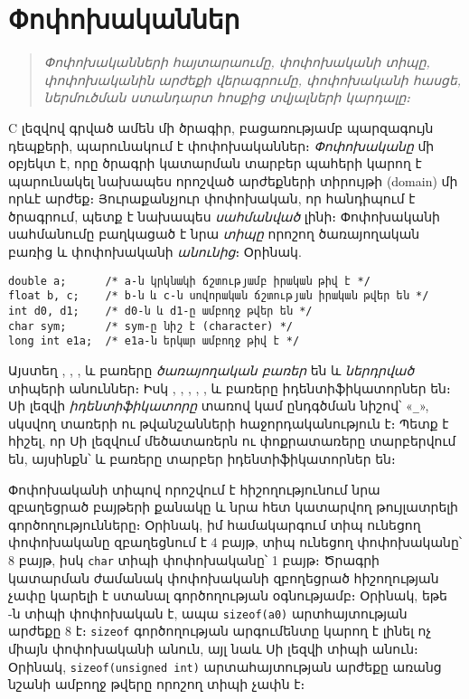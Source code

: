 \chapter{Փոփոխականներ}

\begin{quote}
\emph{Փոփոխականների հայտարաումը, փոփոխականի տիպը, փոփոխականին արժեքի
վերագրումը, փոփոխականի հասցե, ներմուծման ստանդարտ հոսքից տվյալների
կարդալը։}
\end{quote}

C լեզվով գրված ամեն մի ծրագիր, բացառությամբ պարզագույն դեպքերի,
պարունակում է փոփոխականներ։ \emph{Փոփոխականը} մի օբյեկտ է, որը ծրագրի
կատարման տարբեր պահերի կարող է պարունակել նախապես որոշված արժեքների
տիրույթի (domain) մի որևէ արժեք։ Յուրաքանչյուր փոփոխական, որ հանդիպում է
ծրագրում, պետք է նախապես \emph{սահմանված} լինի։ Փոփոխականի սահմանումը
բաղկացած է նրա \emph{տիպը} որոշող ծառայողական բառից և փոփոխականի
\emph{անունից}։ Օրինակ.

\begin{Verbatim}
double a;      /* a-ն կրկնակի ճշտությամբ իրական թիվ է */
float b, c;    /* b-ն և c-ն սովորական ճշտության իրական թվեր են */
int d0, d1;    /* d0-ն և d1-ը ամբողջ թվեր են */
char sym;      /* sym-ը նիշ է (character) */
long int e1a;  /* e1a-ն երկար ամբողջ թիվ է */
\end{Verbatim}

Այստեղ , , ,  և 
բառերը \emph{ծառայողական բառեր} են և \emph{ներդրված} տիպերի անուններ։
Իսկ , , , , ,
 և  բառերը իդենտիֆիկատորներ են։ Սի լեզվի
\emph{իդենտիֆիկատորը} տառով կամ ընդգծման նիշով՝ «\verb|_|», սկսվող
տառերի ու թվանշանների հաջորդականություն է։ Պետք է հիշել, որ Սի լեզվում
մեծատառերն ու փոքրատառերը տարբերվում են, այսինքն՝  և
 բառերը տարբեր իդենտիֆիկատորներ են։

Փոփոխականի տիպով որոշվում է հիշողությունում նրա զբաղեցրած բայթերի
քանակը և նրա հետ կատարվող թույլատրելի գործողությունները։ Օրինակ, իմ
համակարգում  տիպ ունեցող փոփոխականը զբաղեցնում է 4 բայթ,
 տիպ ունեցող փոփոխականը՝ 8 բայթ, իսկ \texttt{char} տիպի
փոփոխականը՝ 1 բայթ։ Ծրագրի կատարման ժամանակ փոփոխականի զբողեցրած
հիշողության չափը կարելի է ստանալ  գործողության օգնությամբ։
Օրինակ, եթե -ն  տիպի փոփոխական է, ապա
\texttt{sizeof(a0)} արտհայտության արժեքը 8 է։ \texttt{sizeof}
գործողության արգումենտը կարող է լինել ոչ միայն փոփոխականի անուն, այլ
նաև Սի լեզվի տիպի անուն։ Օրինակ, \texttt{sizeof(unsigned int)}
արտահայտության արժեքը առանց նշանի ամբողջ թվերը որոշող տիպի չափն է։

